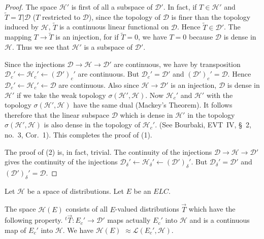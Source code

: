 \begin{proof}
The space $\mathscr{H}'$ is first of all a subspace of
$\mathscr{D}'$. In fact, if $T\in \mathscr{H}'$ and
$\tilde{T}=T|\mathscr{D}$ ($T$ restricted to $\mathscr{D}$), since the
topology of $\mathscr{D}$ is finer than the topology induced by
$\mathscr{H}$, $\tilde{T}$ is a continuous linear functional on
$\mathscr{D}$. Hence $\tilde{T}\in \mathscr{D}'$. The mapping $T \to
\tilde{T}$ is an injection, for if $\tilde{T}=0$, we have $T=0$
because $\mathscr{D}$ is dense in $\mathscr{H}$. Thus we see that
$\mathscr{H}'$ is a subspace of $\mathscr{D}'$.

Since the injections $\mathscr{D}\to \mathscr{H} \to \mathscr{D}'$ are
continuous, we have by transposition $\mathscr{D}_c' \leftarrow
\mathscr{H}_c' \leftarrow (\mathscr{D'})_c'$ are continuous. But
$\mathscr{D}_c'= \mathscr{D}'$ and
$(\mathscr{D'})_c'=\mathscr{D}$. Hence $\mathscr{D}_c'\leftarrow
\mathscr{H}_c'\leftarrow \mathscr{D}$ are continuous. Also since
$\mathscr{H} \to \mathscr{D}'$ is an injection, $\mathscr{D}$ is dense
in $\mathscr{H}'$ if we take the weak topology
$\sigma(\mathscr{H}',\mathscr{H})$. Now $\mathscr{H}_c'$ and
$\mathscr{H}'$ with the topology $\sigma(\mathscr{H}',\mathscr{H})$
have the same dual (Mackey's Theorem). It follows therefore that the
linear subspace $\mathscr{D}$ which is dense in $\mathscr{H}'$ in the
topology $\sigma(\mathscr{H}',\mathscr{H})$ is also dense in the
topology of $\mathscr{H}_c'$. (See \pageoriginale Bourbaki, EVT~IV, \S~2,
no.~3, Cor.~1). This completes the proof of (1).

The proof of (2) is, in fact, trivial. The continuity of the
injections $\mathscr{D}\to \mathscr{H}\to \mathscr{D}'$ gives the
continuity of the injections $\mathscr{D}_\delta'\leftarrow
\mathscr{H}_\delta' \leftarrow (\mathscr{D'})_\delta'$. But
$\mathscr{D}_\delta'= \mathscr{D}'$ and $(\mathscr{D'})_\delta'=\mathscr{D}$.
\end{proof}

Let $\mathscr{H}$ be a space of distributions. Let $E$ be an $ELC$.

\begin{definition}\label{chap3:def3.3}
The space $\mathscr{H}(E)$ consists of all $E$-valued distributions 
$\overrightarrow{T}$ which have the following property. ${}^t
\overrightarrow{T}:E_c'\to \mathscr{D}'$ maps actually $E_c'$ into
$\mathscr{H}$ and is a continuous map of $E_c'$ into $\mathscr{H}$. We
have $\mathscr{H} (E)$ $\approx \mathscr{L}(E_c', \mathscr{H})$. 
\end{definition}

